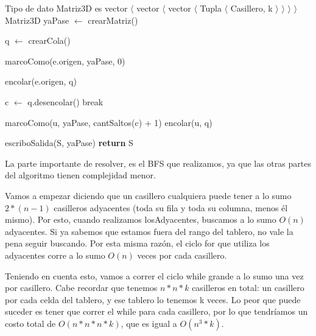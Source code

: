 \begin{pseudo}
\State Tipo de dato Matriz3D es vector $\langle$ vector $\langle$ vector $\langle$ Tupla $\langle$ Casillero, k $\rangle$ $\rangle$ $\rangle$ $\rangle$
        \State Matriz3D yaPase $\leftarrow$ crearMatriz() 
        
		\State q $\leftarrow$ crearCola() 
		
		\State marcoComo(e.origen, yaPase, 0) 
		
		\State encolar(e.origen, q) 
		
		 
			\State c $\leftarrow$ q.desencolar() 
				\State break
			\EndIf
			
			 
			     
					\State marcoComo(u, yaPase, cantSaltos(c) + 1) 
					\State encolar(u, q) 
				\EndIf
      		\EndFor
		\EndWhile

      	\State escriboSalida(S, yaPase) 
      	\State \textbf{return} S
        
    \EndProcedure
\end{pseudo}

La parte importante de resolver, es el BFS que realizamos, ya que las otras partes del algoritmo tienen complejidad menor.

Vamos a empezar diciendo que un casillero cualquiera puede tener a lo sumo $2*(n-1)$ casilleros adyacentes (toda su fila y toda su columna, menos él mismo). Por esto, cuando realizamos losAdyacentes, buscamos a lo sumo $O(n)$ adyacentes. Si ya sabemos que estamos fuera del rango del tablero, no vale la pena seguir buscando. Por esta misma razón, el ciclo for que utiliza los adyacentes corre a lo sumo $O(n)$ veces por cada casillero.

Teniendo en cuenta esto, vamos a correr el ciclo while grande a lo sumo una vez por casillero. Cabe recordar que tenemos $n*n*k$ casilleros en total: un casillero por cada celda del tablero, y ese tablero lo tenemos k veces. Lo peor que puede suceder es tener que correr el while para cada casillero, por lo que tendríamos un costo total de $O(n*n*n*k)$, que es igual a $O(n^3*k)$.

